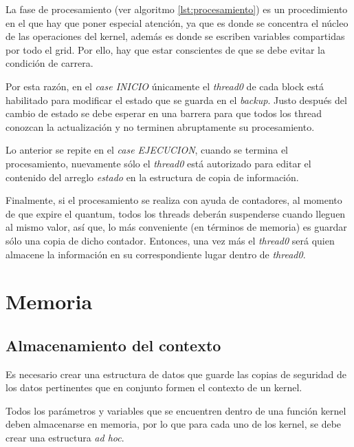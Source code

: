 La fase de procesamiento (ver algoritmo \ref{lst:procesamiento}) es un procedimiento en el que hay que poner especial atención, ya que es donde se concentra el núcleo de las operaciones del kernel, además es donde se escriben variables compartidas por todo el grid. Por ello, hay que estar conscientes de que se debe evitar la condición de carrera.
\newline

Por esta razón, en el \textit{case INICIO} únicamente el \textit{thread0} de cada block está habilitado para modificar el estado que se guarda en el \textit{backup}. Justo después del cambio de estado se debe esperar en una barrera para que todos los thread conozcan la actualización y no terminen abruptamente su procesamiento.
\newline

Lo anterior se repite en el \textit{case EJECUCION}, cuando se termina el procesamiento, nuevamente sólo el \textit{thread0} está autorizado para editar el contenido del arreglo \textit{estado} en la estructura de copia de información.
\newline

Finalmente, si el procesamiento se realiza con ayuda de contadores, al momento de que expire el quantum, todos los threads deberán suspenderse cuando lleguen al mismo valor, así que, lo más conveniente (en términos de memoria) es guardar sólo una copia de dicho contador. Entonces, una vez más el \textit{thread0} será quien almacene la información en su correspondiente lugar dentro de \textit{thread0}.


  \section{Memoria}\label{secc:memoria}

  \subsection{Almacenamiento del contexto}

Es necesario crear una estructura de datos que guarde las copias de seguridad de los datos pertinentes que en conjunto formen el contexto de un kernel.
\newline

Todos los parámetros y variables que se encuentren dentro de una función kernel deben almacenarse en memoria, por lo que para cada uno de los kernel, se debe crear una estructura \textit{ad hoc}.
\newline

